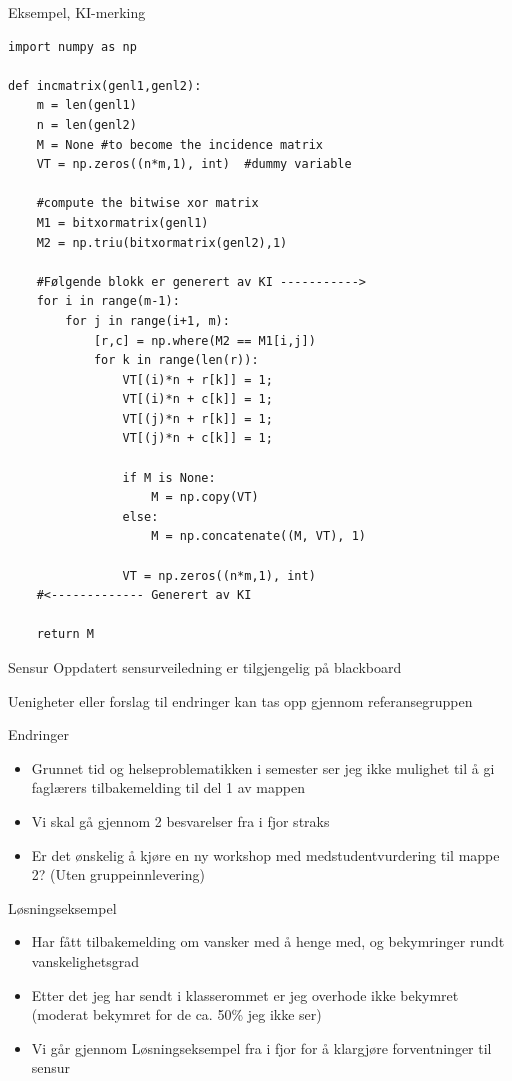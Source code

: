 \documentclass[aspectratio=169]{beamer}
\begin{document}
\begin{frame}[fragile]{Eksempel, KI-merking}
   \tiny
   \begin{verbatim}
import numpy as np

def incmatrix(genl1,genl2):
    m = len(genl1)
    n = len(genl2)
    M = None #to become the incidence matrix
    VT = np.zeros((n*m,1), int)  #dummy variable

    #compute the bitwise xor matrix
    M1 = bitxormatrix(genl1)
    M2 = np.triu(bitxormatrix(genl2),1)

    #Følgende blokk er generert av KI ----------->
    for i in range(m-1):
        for j in range(i+1, m):
            [r,c] = np.where(M2 == M1[i,j])
            for k in range(len(r)):
                VT[(i)*n + r[k]] = 1;
                VT[(i)*n + c[k]] = 1;
                VT[(j)*n + r[k]] = 1;
                VT[(j)*n + c[k]] = 1;

                if M is None:
                    M = np.copy(VT)
                else:
                    M = np.concatenate((M, VT), 1)

                VT = np.zeros((n*m,1), int)
    #<------------- Generert av KI

    return M
   \end{verbatim}
\end{frame}

\begin{frame}{Sensur}
   \huge
   Oppdatert sensurveiledning er tilgjengelig på blackboard
   
   Uenigheter eller forslag til endringer kan tas opp gjennom referansegruppen
\end{frame}

\begin{frame}{Endringer}
   \begin{itemize}
      \item {Grunnet tid og helseproblematikken i semester ser jeg ikke mulighet til å gi faglærers tilbakemelding til del 1 av mappen}
      \item {Vi skal gå gjennom 2 besvarelser fra i fjor straks}
      \item {Er det ønskelig å kjøre en ny workshop med medstudentvurdering til mappe 2? (Uten gruppeinnlevering)}
   \end{itemize}
\end{frame}

\begin{frame}{Løsningseksempel}
   \begin{itemize}
      \item {Har fått tilbakemelding om vansker med å henge med, og bekymringer rundt vanskelighetsgrad}
      \item {Etter det jeg har sendt i klasserommet er jeg overhode ikke bekymret (moderat bekymret for de ca. 50\% jeg ikke ser)}
      \item {Vi går gjennom Løsningseksempel fra i fjor for å klargjøre forventninger til sensur}
   \end{itemize}
\end{frame}
\end{document}
